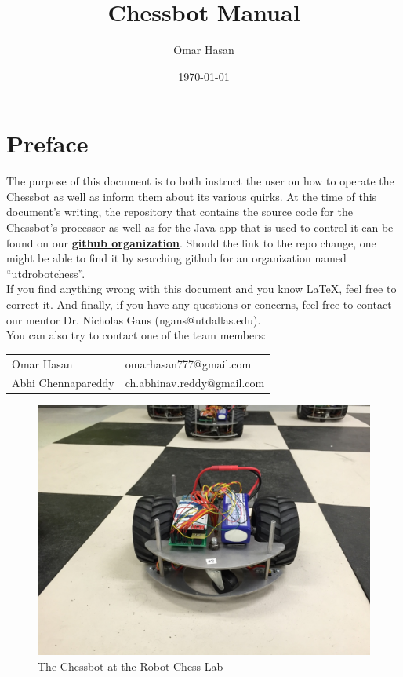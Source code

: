 \documentclass[letterpaper,12pt]{report}
\newcommand{\github}{\href{https://github.com/utdrobotchess}
        {\textbf{github organization}}}
\begin{document}
\title{\textbf{Chessbot Manual}}
\author{Omar Hasan}

\date{\today}
\maketitle

\pagebreak

\section*{Preface}
\label{sec:preface}
The purpose of this document is to both instruct the user on how to operate the
Chessbot as well as inform them about its various quirks. At the time of this
document's writing, the repository that contains the source code for the
Chessbot's processor as well as for the Java app that is used to control it can
be found on our \github. Should the link to the repo change, one might be able
to find it by searching github for an organization named ``utdrobotchess''.\\

If you find anything wrong with this document and you know LaTeX, feel free to
correct it. And finally, if you have any questions or concerns, feel free to
contact our mentor Dr. Nicholas Gans (ngans@utdallas.edu).\\

You can also try to contact one of the team members:\\
\begin{center}
\begin{tabular}{l l}
    Omar Hasan & omarhasan777@gmail.com \\
    Abhi Chennapareddy & ch.abhinav.reddy@gmail.com
\end{tabular}
\end{center}

\begin{figure}[!h]
\centering
\includegraphics[width=14cm]{./pics/chessbot-front.jpg}
    \caption{The Chessbot at the Robot Chess Lab}
\end{figure}
\end{document}
